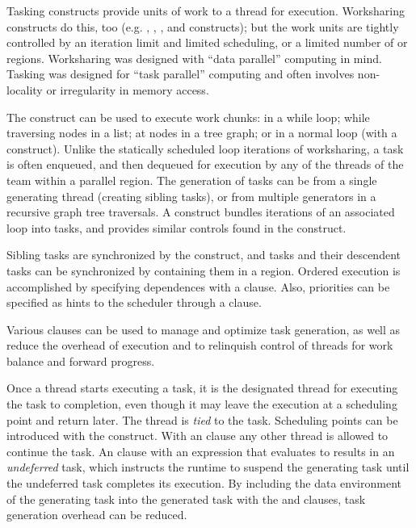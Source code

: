 \label{chap:tasking}

Tasking constructs provide units of work to a thread for execution.  
Worksharing constructs do this, too (e.g. , , 
, and  constructs); 
but the work units are tightly controlled by an iteration limit and limited 
scheduling, or a limited number of  or  regions. 
Worksharing was designed 
with ``data parallel'' computing in mind.  Tasking was designed for 
``task parallel'' computing and often involves non-locality or irregularity 
in memory access.

The  construct can be used to execute work chunks: in a while loop; 
while traversing nodes in a list; at nodes in a tree graph; 
or in a normal loop (with a  construct).  
Unlike the statically scheduled loop iterations of worksharing, a task is 
often enqueued, and then dequeued for execution by any of the threads of the
team within a parallel region. The generation of tasks can be from a single 
generating thread (creating sibling tasks), or from multiple generators
in a recursive graph tree traversals. 
A  construct
bundles iterations of an associated loop into tasks, and provides 
similar controls found in the  construct.

Sibling tasks are synchronized by the  construct, and tasks
and their descendent tasks can be synchronized by containing them in
a  region.  Ordered execution is accomplished by specifying
dependences with a  clause. Also, priorities can be
specified as hints to the scheduler through a  clause.

Various clauses can be used to manage and optimize task generation,
as well as reduce the overhead of execution and to relinquish 
control of threads for work balance and forward progress. 

Once a thread starts executing a task, it is the designated thread
for executing the task to completion, even though it may leave the
execution at a scheduling point and return later.  The thread is \emph{tied}
to the task.  Scheduling points can be introduced with the 
construct.  With an  clause any other thread is allowed to continue
the task.  An  clause with an expression that evaluates to 
results in an \emph{undeferred} task, which instructs the runtime to suspend
the generating task until the undeferred task completes its execution.
By including the data environment of the generating task into the generated task with the 
 and  clauses, task generation overhead can be reduced.

